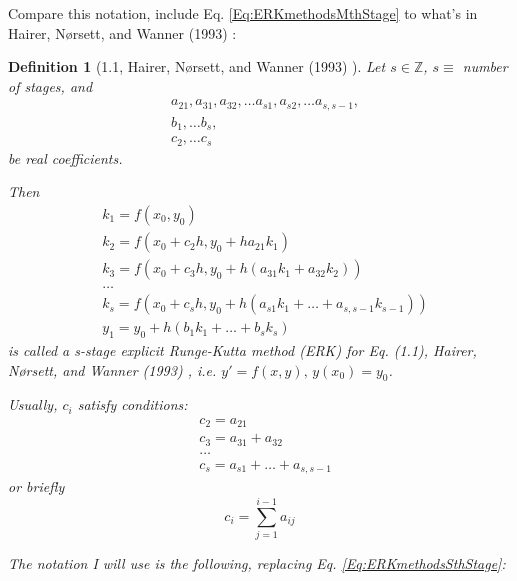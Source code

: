 \documentclass[10pt]{amsart}
\newtheorem{definition}{Definition}
\begin{document}
\begin{multicols*}{2}
Compare this notation, include Eq. \ref{Eq:ERKmethodsMthStage} to what's in Hairer, N\o rsett, and Wanner (1993) \cite{HNW1993}:

\begin{definition}[1.1, Hairer, N\o rsett, and Wanner (1993) \cite{HNW1993}]
	Let $s \in \mathbb{Z}$, $s \equiv $ number of stages, and 
	\begin{equation}
		\begin{aligned}
			& a_{21}, a_{31}, a_{32}, \dots a_{s1}, a_{s2}, \dots a_{s,s-1}, \\
			& b_1, \dots b_s, \\
			& c_2, \dots c_s
		\end{aligned}
	\end{equation}
be real coefficients.

Then
\begin{equation}\label{Eq:ERKmethodsSthStage}
	\begin{aligned}
		& k_1 = f(x_0, y_0) \\
		& k_2 = f(x_0 + c_2h, y_0 + ha_{21} k_1) \\
		& k_3 = f(x_0 + c_3h, y_0 + h(a_{31} k_1 + a_{32}k_2)) \\
		& \dots \\
		& k_s = f(x_0 + c_s h, y_0 + h(a_{s1} k_1+ \dots + a_{s, s-1} k_{s-1})) \\
		& y_1 = y_0 + h(b_1k_1 + \dots + b_s k_s)
	\end{aligned}
\end{equation}
is called a s-stage explicit Runge-Kutta method (ERK) for Eq. (1.1), Hairer, N\o rsett, and Wanner (1993) \cite{HNW1993}, i.e. $y' = f(x, y), \, y(x_0) = y_0$.

Usually, $c_i $ satisfy conditions:
\[
\begin{aligned}
	& c_2 = a_{21} \\
	& c_3 = a_{31} + a_{32} \\
	& \dots \\
	& c_s = a_{s1} + \dots + a_{s,s-1}
\end{aligned}
\]
or briefly
\[
c_i = \sum_{j=1}^{i-1} a_{ij}
\]

The notation I will use is the following, replacing Eq. \ref{Eq:ERKmethodsSthStage}:


\end{definition}
\end{multicols*}
\end{document}
